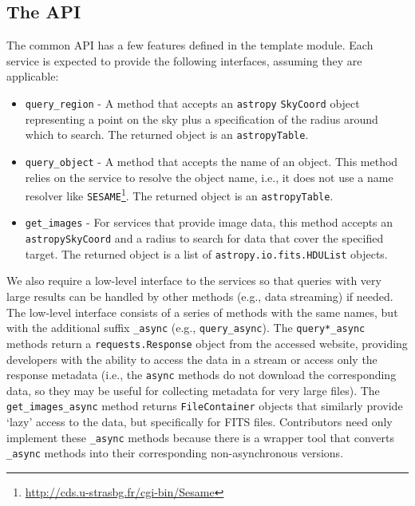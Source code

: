 \documentclass[twocolumn]{aastex62}
\newcommand{\package}[1]{\texttt{#1}\xspace}
\newcommand{\astropypkg}{\package{astropy}}
\begin{document}
\subsection{The API}
The common API has a few features defined in the template module.
Each service is expected to provide the following interfaces, assuming they are
applicable:

\begin{itemize}
    \item \texttt{query\_region} - A method that accepts an \astropypkg
        \texttt{SkyCoord} object representing a point on the sky plus a
        specification of the radius around which to search.
        The returned object is an \astropypkg \texttt{Table}.
    \item \texttt{query\_object} - A method that accepts the name of an
        object.  This method relies on the service to resolve the object name, i.e., it does not use a name resolver
        like \texttt{SESAME}\footnote{\url{http://cds.u-strasbg.fr/cgi-bin/Sesame}}.
        The returned object is an \astropypkg \texttt{Table}.
    \item \texttt{get\_images} - For services that provide image data, this
        method accepts an \astropypkg \texttt{SkyCoord} and a radius to search for data
        that cover the specified target. The returned object is a list
        of \texttt{astropy.io.fits.HDUList} objects.

\end{itemize}

We also require a low-level interface to the services so that queries
with very large results can be handled by other methods (e.g., data streaming)
if needed.
The low-level interface consists of a series of methods with the same
names, but with the additional suffix \texttt{\_async} (e.g.,
\texttt{query\_async}).  The
\texttt{query*\_async} methods return a \texttt{requests.Response} object
from the accessed website, providing developers with
the ability to access the data in a stream or access only the response
metadata (i.e., the \texttt{async} methods do not download the corresponding
data, so they may be useful for collecting metadata for very large files).  The
\texttt{get\_images\_async} method returns
\texttt{FileContainer} objects that similarly provide `lazy' access to the
data, but specifically for FITS files.  Contributors need only implement
these \texttt{\_async} methods because there is a wrapper tool that converts
\texttt{\_async} methods into their corresponding non-asynchronous versions.
\end{document}
